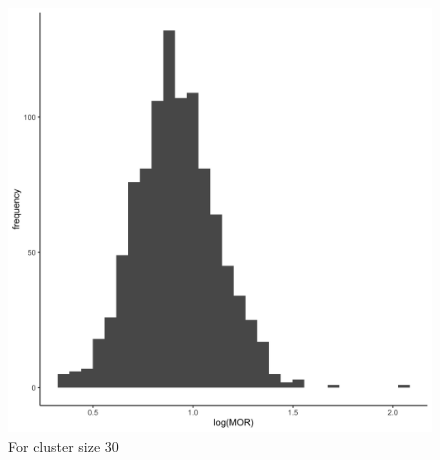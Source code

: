 \documentclass[
  letterpaper,
  DIV=11,
  numbers=noendperiod,
  titlepage]{scrartcl}
\begin{document}
\begin{figure}
\begin{minipage}[t]{0.50\linewidth}
{{\includegraphics{../../plots/two-lvl-ran-slope/low-prev/hist_30_30_two_lvl_slp_low_prev.png}

}

\caption{For cluster size 30}

}

\end{minipage}%
%
\begin{minipage}[t]{0.50\linewidth}

{\centering 

}
\end{minipage}
\end{figure}
\end{document}
